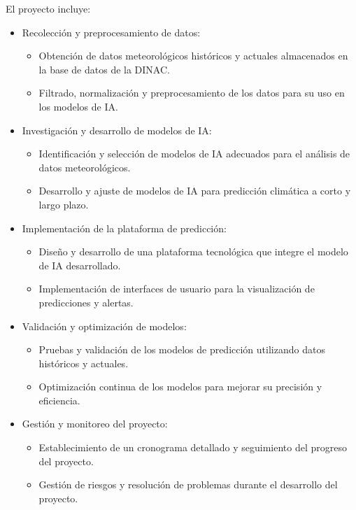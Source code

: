 \documentclass[
11pt, %
codirector, %
]{charter}
\begin{document}
El proyecto incluye:
\begin{itemize}
	\item Recolección y preprocesamiento de datos:
		\begin{itemize}
		\item Obtención de datos meteorológicos históricos y actuales almacenados en la base de
datos de la DINAC.
		\item Filtrado, normalización y preprocesamiento de los datos para su uso en los modelos de IA.
		\end{itemize}
	\item Investigación y desarrollo de modelos de IA:
		\begin{itemize}
		\item Identificación y selección de modelos de IA adecuados para el análisis de datos meteorológicos.
		\item Desarrollo y ajuste de modelos de IA para predicción climática a corto y largo plazo.
		\end{itemize}
	\item Implementación de la plataforma de predicción:
		\begin{itemize}
		\item Diseño y desarrollo de una plataforma tecnológica que integre el modelo de IA desarrollado.
		\item Implementación de interfaces de usuario para la visualización de predicciones y alertas.
		\end{itemize}
	\item Validación y optimización de modelos:
		\begin{itemize}
		\item Pruebas y validación de los modelos de predicción utilizando datos históricos y actuales.
		\item Optimización continua de los modelos para mejorar su precisión y eficiencia.
		\end{itemize}
	\item Gestión y monitoreo del proyecto:
		\begin{itemize}
		\item Establecimiento de un cronograma detallado y seguimiento del progreso del proyecto.
		\item Gestión de riesgos y resolución de problemas durante el desarrollo del proyecto.
		\end{itemize}
	
\end{itemize}
\end{document}
